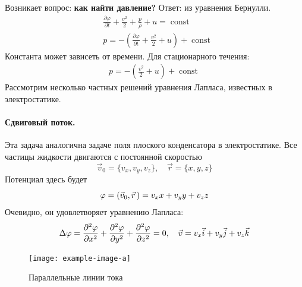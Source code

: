 Возникает вопрос: \textbf{как найти давление?} Ответ: из уравнения Бернулли.
\begin{align*}
& \frac { \partial \varphi } { \partial t } + \frac { v ^ { 2 } } { 2 } + \frac { p } { \rho } + u = \operatorname { const } \\
& p = - \left( \frac { \partial \varphi } { \partial t } + \frac { v ^ { 2 } } { 2 } + u \right) + \operatorname { const }
\end{align*}
Константа может зависеть от времени. Для стационарного течения:
\begin{align*}
p = - \left( \frac { v ^ { 2 } } { 2 } + u \right) + \operatorname { const }
\end{align*}
Рассмотрим несколько частных решений уравнения Лапласа, известных в  электростатике.

\paragraph{Сдвиговый поток.} Эта задача аналогична задаче поля плоского конденсатора в электростатике. Все частицы жидкости двигаются с постоянной скоростью
\begin{equation}
    \vec{v}_0 = \{v_x, v_y, v_z\}, \quad
    \vec{r} = \{x,y,z\}
\end{equation}
Потенциал здесь будет
\begin{equation}
    \varphi = \qty(\vec{v}_0,\vec{r}\,) = v_x x + v_y y + v_z z
\end{equation}
Очевидно, он удовлетворяет уравнению Лапласа:
\begin{equation}
    \Delta \varphi = \pdv[2]{\varphi}{x}+ \pdv[2]{\varphi}{y} + \pdv[2]{\varphi}{z}=0, \quad
    \vec{v} = v_x \vec{i} + v_y \vec{j} + v_z \vec{k}
\end{equation}
\begin{figure}[H]
    \centering
    \texttt{[image: example-image-a]}
    \caption{Параллельные линии тока}
    \label{fig:sdvigovuipotok}
\end{figure}

